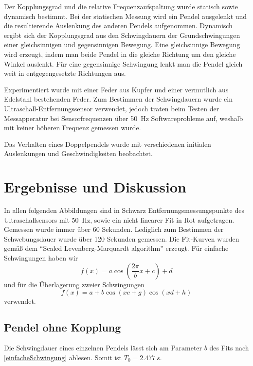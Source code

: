 \documentclass[
	a4paper,
	12pt,
	pagesize,
	ngerman
]{scrartcl}
\begin{document}
	Der Kopplungsgrad und die relative Frequenzaufspaltung wurde statisch sowie dynamisch bestimmt. Bei der statischen Messung wird ein Pendel ausgelenkt und die resultierende Auslenkung des anderen Pendels aufgenommen. Dynamisch ergibt sich der Kopplungsgrad aus den Schwingdauern der Grundschwingungen einer gleichsinnigen und gegensinnigen Bewegung. Eine gleichsinnige Bewegung wird erzeugt, indem man beide Pendel in die gleiche Richtung um den gleiche Winkel auslenkt. Für eine gegensinnige Schwingung lenkt man die Pendel gleich weit in entgegengesetzte Richtungen aus.
	
	Experimentiert wurde mit einer Feder aus Kupfer und einer vermutlich aus Edelstahl bestehenden Feder.
	Zum Bestimmen der Schwingdauern wurde ein Ultraschall-Entfernungssensor verwendet, jedoch traten beim Testen der Messapperatur bei Sensorfrequenzen über \SI{50}{Hz} Softwareprobleme auf, weshalb mit keiner höheren Frequenz gemessen wurde.

	Das Verhalten eines Doppelpendels wurde mit verschiedenen initialen Auslenkungen und Geschwindigkeiten beobachtet. 
	

	\section{Ergebnisse und Diskussion}
	In allen folgenden Abbildungen sind in Schwarz Entfernungsmessungspunkte des Ultraschallsensors mit \SI{50}{Hz}, sowie ein nicht linearer Fit in Rot aufgetragen. Gemessen wurde immer über \SI{60}{} Sekunden. Lediglich zum Bestimmen der Schwebungsdauer wurde über \SI{120}{} Sekunden gemessen. %
	Die Fit-Kurven wurden gemäß dem \enquote{Scaled Levenberg-Marquardt algorithm} erzeugt. 
	Für einfache Schwingungen haben wir
	\begin{equation}
		\label{einfacheSchwingung}
		f(x)=a \cos(\frac{2\pi}{b}x+c)+d
	\end{equation}
	und für die Überlagerung zweier Schwingungen
	\begin{equation}
		\label{überlagerteSchwingung}
		f(x)=a + b\cos(xc+g)\cos(xd+h)
	\end{equation}
	verwendet.
	\subsection{Pendel ohne Kopplung}
	Die Schwingdauer eines einzelnen Pendels lässt sich am Parameter $b$ des Fits nach \cref{einfacheSchwingung} ablesen. Somit ist $T_0 =  \SI{2,477}{s}$.
\end{document}
